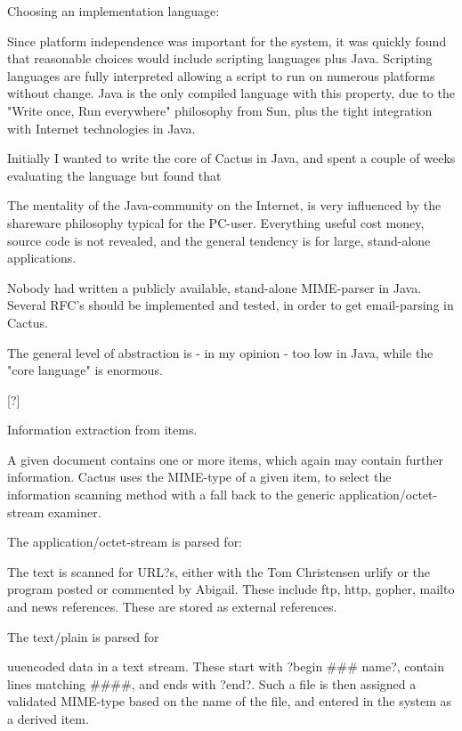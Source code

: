 Choosing an implementation language:
\label{sec:cactus-choice-of-language}

Since platform independence was important for the system, it was
quickly found that reasonable choices would include scripting
languages plus Java.  Scripting languages are fully interpreted
allowing a script to run on numerous platforms without change.  Java
is the only compiled language with this property, due to the "Write
once, Run everywhere" philosophy from Sun, plus the tight integration
with Internet technologies in Java.

Initially I wanted to write the core of Cactus in Java, and spent a
couple of weeks evaluating the language but found that


  The mentality of the Java-community on the Internet, is very influenced by the shareware philosophy typical for the PC-user.   Everything useful cost money, source
code is not revealed, and the general tendency is for large, stand-alone applications.

Nobody had written a publicly available, stand-alone MIME-parser in Java.  Several RFC's should be implemented and tested, in order to get email-parsing in Cactus.

The general level of abstraction is - in my opinion - too low in Java, while the "core language" is enormous.



[?]



Information extraction from items.



A given document contains one or more items, which again may contain
further information.  Cactus uses the MIME-type of a given item, to
select the information scanning method with a fall back to the generic
application/octet-stream examiner.

The application/octet-stream is parsed for:

The text is scanned for URL?s, either with the Tom Christensen urlify
or the program posted or commented by Abigail.  These include ftp,
http, gopher, mailto and news references.  These are stored as
external references.

The text/plain is parsed for

uuencoded data in a text stream.  These start with ?begin \#\#\#
name?, contain lines matching \#\#\#\#, and ends with ?end?.  Such a
file is then assigned a validated MIME-type based on the name of the
file, and entered in the system as a derived item.


